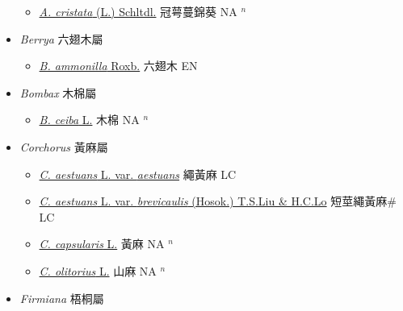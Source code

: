 \begin{itemize}
  \begin{itemize}
        \item[] \href{http://www.theplantlist.org/tpl1.1/search?q=Anoda+cristata}{\textit{A. cristata} (L.) Schltdl.}   冠萼蔓錦葵 NA $^n$
  \end{itemize}
 \item[] \textit{Berrya} 六翅木屬
                    
  \begin{itemize}
        \item[] \href{http://www.theplantlist.org/tpl1.1/search?q=Berrya+ammonilla}{\textit{B. ammonilla} Roxb.}   六翅木 EN
  \end{itemize}
 \item[] \textit{Bombax} 木棉屬
                    
  \begin{itemize}
        \item[] \href{http://www.theplantlist.org/tpl1.1/search?q=Bombax+ceiba}{\textit{B. ceiba} L.}     木棉 NA $^n$
  \end{itemize}
 \item[] \textit{Corchorus} 黃麻屬
                    
  \begin{itemize}
        \item[] \href{http://www.theplantlist.org/tpl1.1/search?q=Corchorus+aestuans+var.+aestuans}{\textit{C. aestuans} L. var. \textit{aestuans}}   繩黃麻 LC
        \item[] \href{http://www.theplantlist.org/tpl1.1/search?q=Corchorus+aestuans+var.+brevicaulis}{\textit{C. aestuans} L. var. \textit{brevicaulis} (Hosok.) T.S.Liu \& H.C.Lo}   短莖繩黃麻\# LC
        \item[] \href{http://www.theplantlist.org/tpl1.1/search?q=Corchorus+capsularis}{\textit{C. capsularis} L.}   黃麻 NA $^n$
        \item[] \href{http://www.theplantlist.org/tpl1.1/search?q=Corchorus+olitorius}{\textit{C. olitorius} L.}   山麻 NA $^n$
  \end{itemize}
 \item[] \textit{Firmiana} 梧桐屬
                    

\end{itemize}
